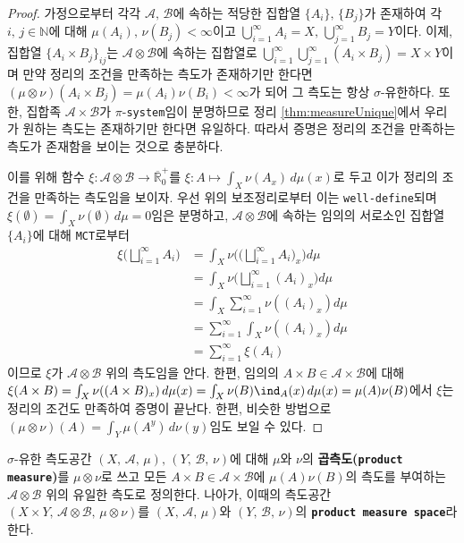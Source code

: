 \begin{proof}
    가정으로부터 각각 $\mathcal{A},\,\mathcal{B}$에 속하는 적당한 집합열 $\{A_i\},\,\{B_j\}$가 존재하여 각 $i,\,j\in\mathbb{N}$에 대해 $\mu(A_i),\,\nu(B_j)<\infty$이고 $\bigcup_{i=1}^\infty A_i=X,\,\bigcup_{j=1}^\infty B_j=Y$이다. 이제, 집합열 $\{A_i\times B_j\}_{ij}$는 $\mathcal{A}\otimes\mathcal{B}$에 속하는 집합열로 $\bigcup_{i=1}^\infty\bigcup_{j=1}^\infty(A_i\times B_j)=X\times Y$이며 만약 정리의 조건을 만족하는 측도가 존재하기만 한다면 $(\mu\otimes\nu)(A_i\times B_j)=\mu(A_i)\nu(B_i)<\infty$가 되어 그 측도는 항상 $\sigma$-유한하다. 또한, 집합족 $\mathcal{A}\times\mathcal{B}$가 $\pi$-\texttt{system}임이 분명하므로 정리 \ref{thm:measureUnique}에서 우리가 원하는 측도는 존재하기만 한다면 유일하다. 따라서 증명은 정리의 조건을 만족하는 측도가 존재함을 보이는 것으로 충분하다.

    이를 위해 함수 $\xi:\mathcal{A}\otimes\mathcal{B}\to\overline{\mathbb{R}}^+_0$를 $\xi:A\mapsto\int_X\nu(A_x)\,d\mu(x)$로 두고 이가 정리의 조건을 만족하는 측도임을 보이자. 우선 위의 보조정리로부터 이는 \texttt{well-define}되며 $\xi(\emptyset)=\int_X\nu(\emptyset)\,d\mu=0$임은 분명하고, $\mathcal{A}\otimes\mathcal{B}$에 속하는 임의의 서로소인 집합열 $\{A_i\}$에 대해 \texttt{MCT}로부터
    \begin{align*}
        \xi\bigg(\bigsqcup_{i=1}^\infty A_i\bigg)&=\int_X\nu\bigg(\bigg(\bigsqcup_{i=1}^\infty A_i\bigg)_x\bigg)d\mu\\
        &=\int_X\nu\bigg(\bigsqcup_{i=1}^\infty (A_i)_x\bigg)d\mu\\
        &=\int_X\sum_{i=1}^\infty\nu((A_i)_x)d\mu\\
        &=\sum_{i=1}^\infty\int_X\nu((A_i)_x)d\mu\\
        &=\sum_{i=1}^\infty\xi(A_i)
    \end{align*}
    이므로 $\xi$가 $\mathcal{A}\otimes\mathcal{B}$ 위의 측도임을 안다. 한편, 임의의 $A\times B\in\mathcal{A}\times\mathcal{B}$에 대해 $\xi(A\times B)=\int_X\nu((A\times B)_x)\,d\mu(x)=\int_X\nu(B)\ind_A(x)\,d\mu(x)=\mu(A)\nu(B)$에서 $\xi$는 정리의 조건도 만족하여 증명이 끝난다. 한편, 비슷한 방법으로 $(\mu\otimes\nu)(A)=\int_Y\mu(A^y)\,d\nu(y)$임도 보일 수 있다.
\end{proof}

\begin{definition}
    $\sigma$-유한 측도공간 $(X,\,\mathcal{A},\,\mu),\,(Y,\,\mathcal{B},\,\nu)$에 대해 $\mu$와 $\nu$의 \textbf{곱측도(\texttt{product measure})}를 $\mu\otimes\nu$로 쓰고 모든 $A\times B\in\mathcal{A}\times\mathcal{B}$에 $\mu(A)\nu(B)$의 측도를 부여하는 $\mathcal{A}\otimes\mathcal{B}$ 위의 유일한 측도로 정의한다. 나아가, 이때의 측도공간 $(X\times Y,\,\mathcal{A}\otimes\mathcal{B},\,\mu\otimes\nu)$를 $(X,\,\mathcal{A},\,\mu)$와 $(Y,\,\mathcal{B},\,\nu)$의 \textbf{\texttt{product measure space}}라 한다.
\end{definition}

